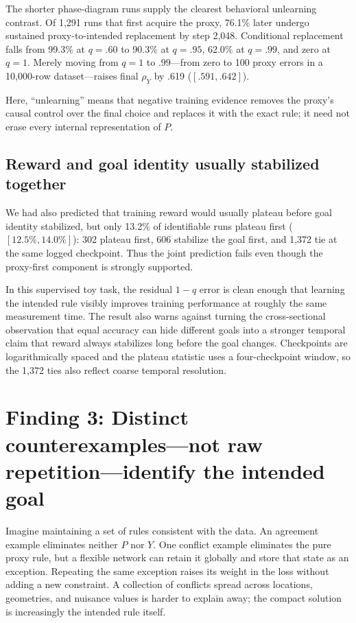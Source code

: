 \documentclass[11pt,a4paper]{article}
\newcommand{\rhoY}{\rho_Y}
\begin{document}
The shorter phase-diagram runs supply the clearest behavioral unlearning contrast. Of 1,291 runs that first acquire the proxy, 76.1\% later undergo sustained proxy-to-intended replacement by step 2,048. Conditional replacement falls from 99.3\% at $q=.60$ to 90.3\% at $q=.95$, 62.0\% at $q=.99$, and zero at $q=1$. Merely moving from $q=1$ to $.99$---from zero to 100 proxy errors in a 10,000-row dataset---raises final $\rhoY$ by .619 ($[.591,.642]$).

Here, ``unlearning'' means that negative training evidence removes the proxy's causal control over the final choice and replaces it with the exact rule; it need not erase every internal representation of $P$.

\subsection*{Reward and goal identity usually stabilized together}

We had also predicted that training reward would usually plateau before goal identity stabilized, but only 13.2\% of identifiable runs plateau first ($[12.5\%,14.0\%]$): 302 plateau first, 606 stabilize the goal first, and 1,372 tie at the same logged checkpoint. Thus the joint prediction fails even though the proxy-first component is strongly supported.

In this supervised toy task, the residual $1-q$ error is clean enough that learning the intended rule visibly improves training performance at roughly the same measurement time. The result also warns against turning the cross-sectional observation that equal accuracy can hide different goals into a stronger temporal claim that reward always stabilizes long before the goal changes. Checkpoints are logarithmically spaced and the plateau statistic uses a four-checkpoint window, so the 1,372 ties also reflect coarse temporal resolution.

\section*{Finding 3: Distinct counterexamples---not raw repetition---identify the intended goal}

Imagine maintaining a set of rules consistent with the data. An agreement example eliminates neither $P$ nor $Y$. One conflict example eliminates the pure proxy rule, but a flexible network can retain it globally and store that state as an exception. Repeating the same exception raises its weight in the loss without adding a new constraint. A collection of conflicts spread across locations, geometries, and nuisance values is harder to explain away; the compact solution is increasingly the intended rule itself.
\end{document}
